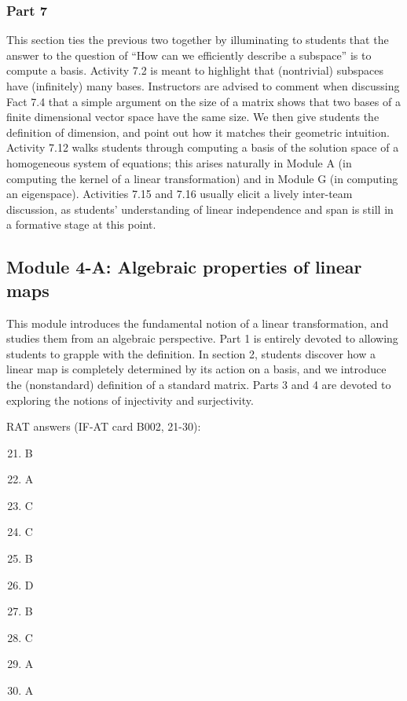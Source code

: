 \documentclass{article}
\begin{document}
\subsubsection*{Part 7}
This section ties the previous two together by illuminating to students that the answer to the question of ``How can we efficiently describe a subspace'' is to compute a basis.  Activity 7.2 is meant to highlight that (nontrivial) subspaces have (infinitely) many bases.  Instructors are advised to comment when discussing Fact 7.4 that a simple argument on the size of a matrix shows that two bases of a finite dimensional vector space have the same size.  We then give students the definition of dimension, and point out how it matches their geometric intuition.  Activity 7.12 walks students through computing a basis of the solution space of a homogeneous system of equations; this arises naturally in Module A (in computing the kernel of a linear transformation) and in Module G (in computing an eigenspace).  Activities 7.15 and 7.16 usually elicit a lively inter-team discussion, as students' understanding of linear independence and span is still in a formative stage at this point.


\subsection*{Module 4-A: Algebraic properties of linear maps}
This module introduces the fundamental notion of a linear transformation, and studies them from an algebraic perspective.   Part 1 is entirely devoted to allowing students to grapple with the definition.  In section 2, students discover how a linear map is completely determined by its action on a basis, and we introduce the (nonstandard) definition of a standard matrix.  Parts 3 and 4 are devoted to exploring the notions of injectivity and surjectivity.

RAT answers (IF-AT card B002, 21-30):
\begin{multicols}{10}
\begin{enumerate}[1)]
\setcounter{enumi}{20}
\item B
\item A
\item C
\item C
\item B
\item D
\item B
\item C
\item A
\item A
\end{enumerate}
\end{multicols}
\end{document}
